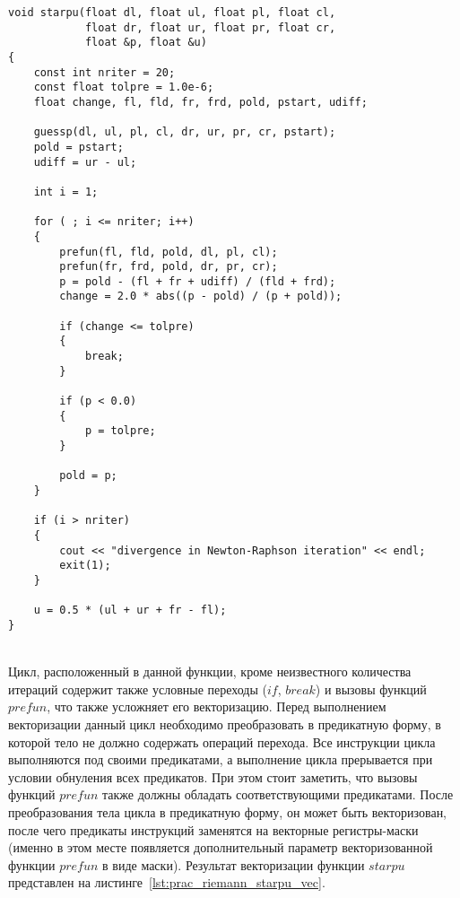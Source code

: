 \documentclass[
11pt,%
tightenlines,%
twoside,%
onecolumn,%
nofloats,%
nobibnotes,%
nofootinbib,%
superscriptaddress,%
noshowpacs,%
centertags]%
{revtex4}
\begin{document}
\begin{lstlisting}[caption={Оригинальная версия функции $starpu$.},label={lst:prac_riemann_starpu_orig}]
void starpu(float dl, float ul, float pl, float cl,
            float dr, float ur, float pr, float cr,
            float &p, float &u)
{
    const int nriter = 20;
    const float tolpre = 1.0e-6;
    float change, fl, fld, fr, frd, pold, pstart, udiff;

    guessp(dl, ul, pl, cl, dr, ur, pr, cr, pstart);
    pold = pstart;
    udiff = ur - ul;

    int i = 1;

    for ( ; i <= nriter; i++)
    {
        prefun(fl, fld, pold, dl, pl, cl);
        prefun(fr, frd, pold, dr, pr, cr);
        p = pold - (fl + fr + udiff) / (fld + frd);
        change = 2.0 * abs((p - pold) / (p + pold));

        if (change <= tolpre)
        {
            break;
        }

        if (p < 0.0)
        {
            p = tolpre;
        }

        pold = p;
    }

    if (i > nriter)
    {
        cout << "divergence in Newton-Raphson iteration" << endl;
        exit(1);
    }

    u = 0.5 * (ul + ur + fr - fl);
}
\end{lstlisting}

\ \\

Цикл, расположенный в данной функции, кроме неизвестного количества итераций содержит также условные переходы ($if$, $break$) и вызовы функций $prefun$, что также усложняет его векторизацию.
Перед выполнением векторизации данный цикл необходимо преобразовать в предикатную форму, в которой тело не должно содержать операций перехода.
Все инструкции цикла выполняются под своими предикатами, а выполнение цикла прерывается при условии обнуления всех предикатов.
При этом стоит заметить, что вызовы функций $prefun$ также должны обладать соответствующими предикатами.
После преобразования тела цикла в предикатную форму, он может быть векторизован, после чего предикаты инструкций заменятся на векторные регистры-маски (именно в этом месте появляется дополнительный параметр векторизованной функции $prefun$ в виде маски).
Результат векторизации функции $starpu$ представлен на листинге~\ref{lst:prac_riemann_starpu_vec}.
\end{document}
